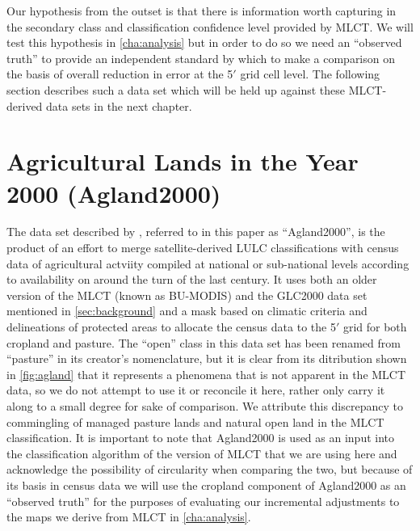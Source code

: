 Our hypothesis from the outset is that there is information worth
capturing in the secondary class and classification confidence level
provided by MLCT.  We will test this hypothesis in
\autoref{cha:analysis} but in order to do so we need an ``observed
truth'' to provide an independent standard by which to make a
comparison on the basis of overall reduction in error at the 5$'$ grid
cell level.  The following section describes such a data set which
will be held up against these MLCT-derived data sets in the next
chapter.



\section{Agricultural Lands in the Year 2000 (Agland2000)}
\label{sec:agland2000}


The data set described by \citet{Ramankutty2008}, referred to in this
paper as ``Agland2000'', is the product of an effort to merge
satellite-derived LULC classifications with census data of
agricultural actviity compiled at national or sub-national levels
according to availability on around the turn of the last century.  It
uses both an older version of the MLCT (known as BU-MODIS) and the
GLC2000 data set mentioned in \autoref{sec:background} and a mask
based on climatic criteria and delineations of protected areas to
allocate the census data to the 5$'$ grid for both cropland and
pasture.  The ``open'' class in this data set has been renamed from
``pasture'' in its creator's nomenclature, but it is clear from its
ditribution shown in \autoref{fig:agland} that it represents a
phenomena that is not apparent in the MLCT data, so we do not attempt
to use it or reconcile it here, rather only carry it along to a small
degree for sake of comparison.  We attribute this discrepancy to
commingling of managed pasture lands and natural open land in the MLCT
classification.  It is important to note that Agland2000 is used as an
input into the classification algorithm of the version of MLCT that we
are using here and acknowledge the possibility of circularity when
comparing the two, but because of its basis in census data we will use
the cropland component of Agland2000 as an ``observed truth'' for the
purposes of evaluating our incremental adjustments to the maps we
derive from MLCT in \autoref{cha:analysis}.
  
